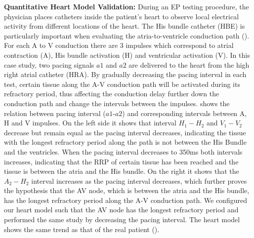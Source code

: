\noindent\textbf{Quantitative Heart Model Validation:} During an EP testing procedure, the physician places catheters inside the patient's heart to observe local electrical activity from different locations of the heart. The His bundle catheter (HBE) is particularly important when evaluating the atria-to-ventricle conduction path (). For each A to V conduction there are 3 impulses which correspond to atrial contraction (A), His bundle activation (H) and ventricular activation (V).  In this case study, two pacing signals $a1$ and $a2$ are delivered to the heart from the high right atrial catheter (HRA). By gradually decreasing the pacing interval in each test, certain tissue along the A-V conduction path will be activated during its refractory period, thus affecting the conduction delay further down the conduction path and change the intervals between the impulses.  shows the relation between pacing interval ($a1$-$a2$) and corresponding intervals between A, H and V impulses. On the left side it shows that interval $H_1-H_2$ and $V_1-V_2$ decrease but remain equal as the pacing interval decreases, indicating the tissue with the longest refractory period along the path is not between the His Bundle and the ventricles. When the pacing interval decreases to 350ms both intervals increases, indicating that the RRP of certain tissue has been reached and the tissue is between the atria and the His bundle. On the right it shows that the $A_2-H_2$ interval increases as the pacing interval decreases, which further proves the hypothesis that the AV node, which is between the atria and the His bundle, has the longest refractory period along the A-V conduction path. We configured our heart model such that the AV node has the longest refractory period and performed the same study by decreasing the pacing interval. The heart model shows the same trend as that of the real patient ().
